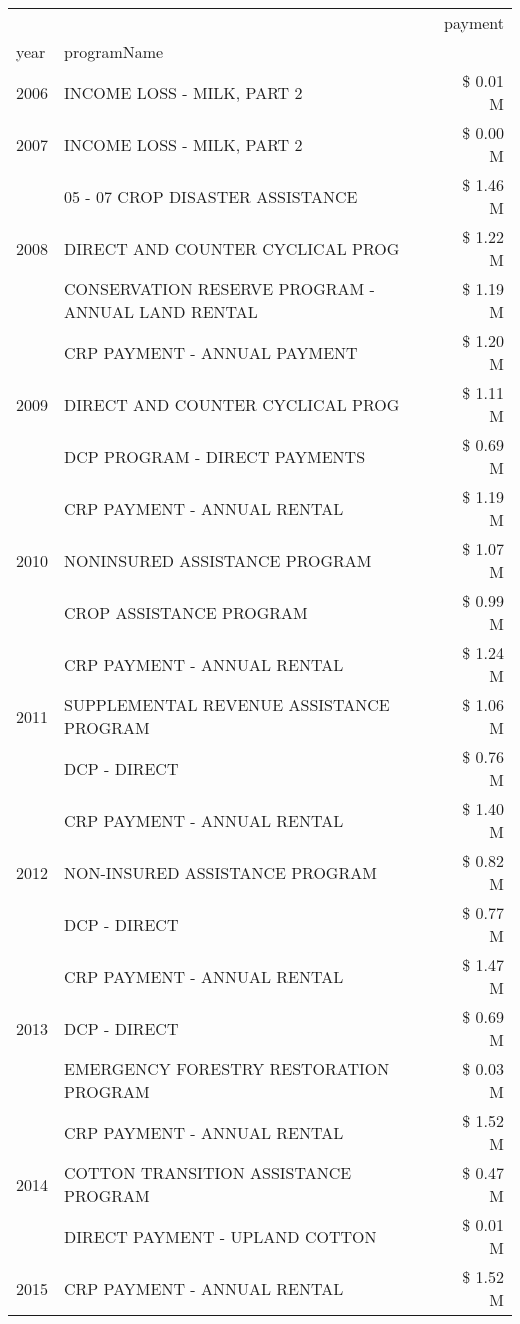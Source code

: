 \begin{tabular}{llr}
\toprule
 &  & payment \\
year & programName &  \\
\midrule
2006 & INCOME LOSS - MILK, PART 2 & \$ 0.01 M \\
\cline{1-3}
2007 & INCOME LOSS - MILK, PART 2 & \$ 0.00 M \\
\cline{1-3}
\multirow[t]{3}{*}{2008} & 05 - 07 CROP DISASTER ASSISTANCE & \$ 1.46 M \\
 & DIRECT AND COUNTER CYCLICAL PROG & \$ 1.22 M \\
 & CONSERVATION RESERVE PROGRAM - ANNUAL LAND RENTAL & \$ 1.19 M \\
\cline{1-3}
\multirow[t]{3}{*}{2009} & CRP PAYMENT - ANNUAL PAYMENT & \$ 1.20 M \\
 & DIRECT AND COUNTER CYCLICAL PROG & \$ 1.11 M \\
 & DCP PROGRAM - DIRECT PAYMENTS & \$ 0.69 M \\
\cline{1-3}
\multirow[t]{3}{*}{2010} & CRP PAYMENT - ANNUAL RENTAL & \$ 1.19 M \\
 & NONINSURED ASSISTANCE PROGRAM & \$ 1.07 M \\
 & CROP ASSISTANCE PROGRAM & \$ 0.99 M \\
\cline{1-3}
\multirow[t]{3}{*}{2011} & CRP PAYMENT - ANNUAL RENTAL & \$ 1.24 M \\
 & SUPPLEMENTAL REVENUE ASSISTANCE PROGRAM & \$ 1.06 M \\
 & DCP - DIRECT & \$ 0.76 M \\
\cline{1-3}
\multirow[t]{3}{*}{2012} & CRP PAYMENT - ANNUAL RENTAL & \$ 1.40 M \\
 & NON-INSURED ASSISTANCE PROGRAM & \$ 0.82 M \\
 & DCP - DIRECT & \$ 0.77 M \\
\cline{1-3}
\multirow[t]{3}{*}{2013} & CRP PAYMENT - ANNUAL RENTAL & \$ 1.47 M \\
 & DCP - DIRECT & \$ 0.69 M \\
 & EMERGENCY FORESTRY RESTORATION PROGRAM & \$ 0.03 M \\
\cline{1-3}
\multirow[t]{3}{*}{2014} & CRP PAYMENT - ANNUAL RENTAL & \$ 1.52 M \\
 & COTTON TRANSITION ASSISTANCE PROGRAM & \$ 0.47 M \\
 & DIRECT PAYMENT - UPLAND COTTON & \$ 0.01 M \\
\cline{1-3}
\multirow[t]{3}{*}{2015} & CRP PAYMENT - ANNUAL RENTAL & \$ 1.52 M \\

\end{tabular}
